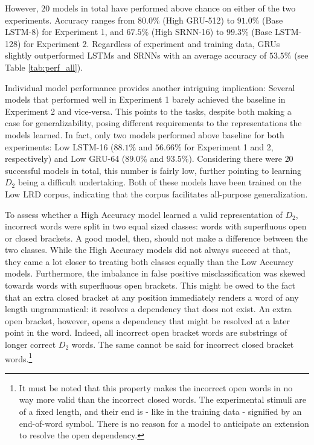 However, $20$ models in total have performed above chance on either of the two experiments. Accuracy ranges from  $80.0\%$ (High GRU-512) to $91.0\%$ (Base LSTM-8) for Experiment 1, and $67.5\%$ (High SRNN-16) to $99.3\%$ (Base LSTM-128) for Experiment 2. Regardless of experiment and training data, GRUs slightly outperformed LSTMs and SRNNs with an average accuracy of $53.5\%$ (see Table \ref{tab:perf_all}).

Individual model performance provides another intriguing implication: Several models that performed well in Experiment 1 barely achieved the baseline in Experiment 2 and vice-versa. This points to the tasks, despite both making a case for generalizability, posing different requirements to the representations the models learned. In fact, only two models performed above baseline for both experiments: Low LSTM-16 ($88.1\%$ and $56.66\%$ for Experiment 1 and 2, respectively) and Low GRU-64 ($89.0\%$ and $93.5\%$). Considering there were $20$ successful models in total, this number is fairly low, further pointing to learning $D_{2}$ being a difficult undertaking. Both of these models have been trained on the Low LRD corpus, indicating that the corpus facilitates all-purpose generalization.

To assess whether a High Accuracy model learned a valid representation of $D_{2}$, incorrect words were split in two equal sized classes: words with superfluous open or closed brackets. A good model, then, should not make a difference between the two classes. While the High Accuracy models did not always succeed at that, they came a lot closer to treating both classes equally than the Low Accuracy models. Furthermore, the imbalance in false positive misclassification was skewed towards words with superfluous open brackets. This might be owed to the fact that an extra closed bracket at any position immediately renders a word of any length ungrammatical: it resolves a dependency that does not exist. An extra open bracket, however, opens a dependency that might be resolved at a later point in the word. Indeed, all incorrect open bracket words are substrings of longer correct $D_{2}$ words. The same cannot be said for incorrect closed bracket words.\footnote{It must be noted that this property makes the incorrect open words in no way more valid than the incorrect closed words. The experimental stimuli are of a fixed length, and their end is - like in the training data - signified by an end-of-word symbol. There is no reason for a model to anticipate an extension to resolve the open dependency.}


